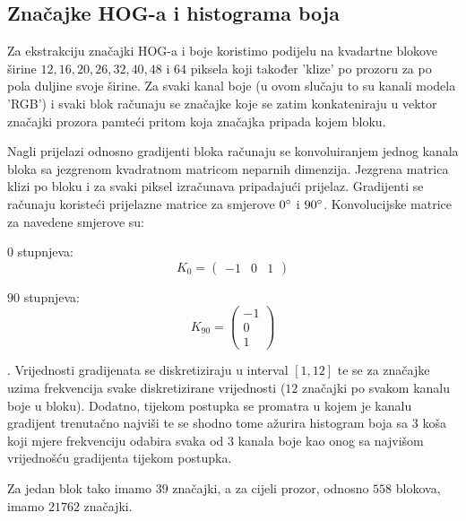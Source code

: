 \documentclass[seminar]{fer}
\begin{document}
\subsection{Značajke HOG-a i histograma boja}
Za ekstrakciju značajki HOG-a i boje koristimo podijelu na kvadartne blokove širine $12, 16, 20, 26, 32, 40, 48$ i $64$ piksela koji također 'klize' po prozoru za po pola duljine svoje širine. Za svaki kanal boje (u ovom slučaju to su kanali modela 'RGB') i svaki blok računaju se značajke koje se zatim konkateniraju u vektor značajki prozora pamteći pritom koja značajka pripada kojem bloku.

Nagli prijelazi odnosno gradijenti bloka računaju se konvoluiranjem jednog kanala bloka sa jezgrenom kvadratnom matricom neparnih dimenzija. Jezgrena matrica klizi po bloku i za svaki piksel izračunava pripadajući prijelaz. Gradijenti se računaju koristeći prijelazne matrice za smjerove $0\degree$ i $90\degree$. Konvolucijske matrice za navedene smjerove su:

$0$ stupnjeva:
\begin{equation*}
K_0 = 
\begin{pmatrix}
-1 & 0 & 1
\end{pmatrix}
\end{equation*}

$90$ stupnjeva:
\begin{equation}
K_{90} = 
\begin{pmatrix}
-1 \\ 0 \\ 1
\end{pmatrix}
\end{equation}

                  .                  
Vrijednosti gradijenata se diskretiziraju u interval $[1, 12]$ te se za značajke uzima frekvencija svake diskretizirane vrijednosti ($12$ značajki po svakom kanalu boje u bloku). Dodatno, tijekom postupka se promatra u kojem je kanalu gradijent trenutačno najviši te se shodno tome ažurira histogram boja sa $3$ koša koji mjere frekvenciju odabira svaka od $3$ kanala boje kao onog sa najvišom vrijednošću gradijenta tijekom postupka.

Za jedan blok tako imamo $39$ značajki, a za cijeli prozor, odnosno $558$ blokova, imamo $21762$ značajki. 
\end{document}
